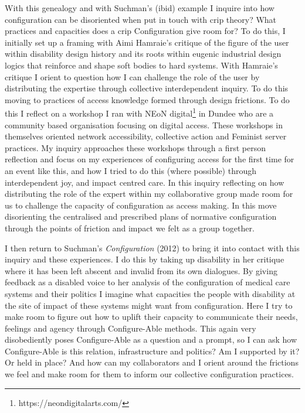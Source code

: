 With this genealogy and with Suchman's (ibid) example I inquire into how
configuration can be disoriented when put in touch with crip theory?
What practices and capacities does a crip Configuration give room for?
To do this, I initially set up a framing with Aimi Hamraie's critique of
the figure of the user within disability design history and its roots
within eugenic industrial design logics that reinforce and shape soft
bodies to hard systems. With Hamraie's critique I orient to question how
I can challenge the role of the user by distributing the expertise
through collective interdependent inquiry. To do this moving to
practices of access knowledge formed through design frictions. To do
this I reflect on a workshop I ran with NEoN digital\footnote{https://neondigitalarts.com/}
in Dundee who are a community based organisation focusing on digital
access. These workshops in themselves oriented network accessibility,
collective action and Feminist server practices. My inquiry approaches
these workshops through a first person reflection and focus on my
experiences of configuring access for the first time for an event like
this, and how I tried to do this (where possible) through interdependent
joy, and impact centred care. In this inquiry reflecting on how
distributing the role of the expert within my collaborative group made
room for us to challenge the capacity of configuration as access making.
In this move disorienting the centralised and prescribed plans of
normative configuration through the points of friction and impact we
felt as a group together.

I then return to Suchman's \emph{Configuration} (2012) to bring it into
contact with this inquiry and these experiences. I do this by taking up
disability in her critique where it has been left abscent and invalid
from its own dialogues. By giving feedback as a disabled voice to her
analysis of the configuration of medical care systems and their politics
I imagine what capacities the people with disability at the site of
impact of these systems might want from configuration. Here I try to
make room to figure out how to uplift their capacity to communicate
their needs, feelings and agency through Configure-Able methods. This
again very disobediently poses Configure-Able as a question and a
prompt, so I can ask how Configure-Able is this relation, infrastructure
and politics? Am I supported by it? Or held in place? And how can my
collaborators and I orient around the frictions we feel and make room
for them to inform our collective configuration practices.

